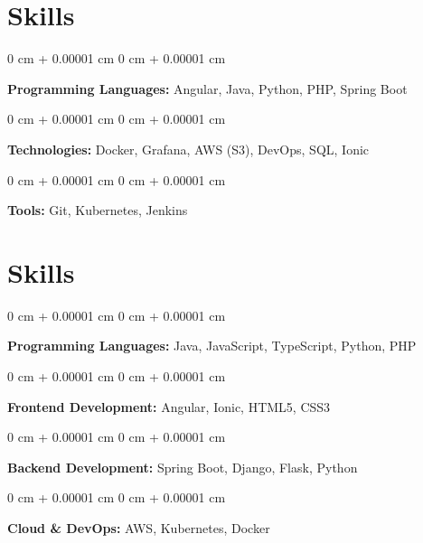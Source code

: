 \documentclass[10pt, letterpaper]{article}
\newenvironment{onecolentry}{
    \begin{adjustwidth}{
        0 cm + 0.00001 cm
    }{
        0 cm + 0.00001 cm
    }
}{
    \end{adjustwidth}
} %
\begin{document}
        \vspace{0.2 cm}

        \section{Skills}
        \begin{onecolentry}
            \textbf{Programming Languages:} Angular, Java, Python, PHP, Spring Boot
        \end{onecolentry}

        \vspace{0.10 cm}
        \begin{onecolentry}
            \textbf{Technologies:} Docker, Grafana, AWS (S3), DevOps, SQL, Ionic
        \end{onecolentry}

        \vspace{0.10 cm}
        \begin{onecolentry}
            \textbf{Tools:} Git, Kubernetes, Jenkins
        \end{onecolentry}

        \vspace{0.2 cm}

    \section{Skills}
        \begin{onecolentry}
            \textbf{Programming Languages:} Java, JavaScript, TypeScript, Python, PHP
        \end{onecolentry}

        \vspace{0.10 cm}
        \begin{onecolentry}
            \textbf{Frontend Development:} Angular, Ionic, HTML5, CSS3
        \end{onecolentry}

        \vspace{0.10 cm}
        \begin{onecolentry}
            \textbf{Backend Development:} Spring Boot, Django, Flask, Python
        \end{onecolentry}

        \vspace{0.10 cm}
        \begin{onecolentry}
            \textbf{Cloud & DevOps:} AWS, Kubernetes, Docker
        \end{onecolentry}
\end{document}
